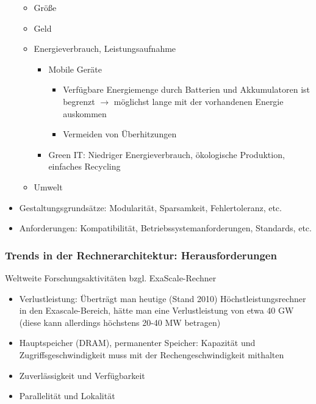 \begin{itemize}
\begin{itemize}
		\item Größe
		\item Geld
		\item Energieverbrauch, Leistungsaufnahme
		\begin{itemize}
			\item Mobile Geräte
			\begin{itemize}
				\item Verfügbare Energiemenge durch Batterien und Akkumulatoren ist begrenzt \(\rightarrow\) möglichst lange mit der vorhandenen Energie auskommen
				\item Vermeiden von Überhitzungen
			\end{itemize}
			\item Green IT: Niedriger Energieverbrauch, ökologische Produktion, einfaches Recycling
		\end{itemize}
		\item Umwelt
	\end{itemize}
	\item Gestaltungsgrundsätze: Modularität, Sparsamkeit, Fehlertoleranz, etc.
	\item Anforderungen: Kompatibilität, Betriebssystemanforderungen, Standards, etc.
\end{itemize}

\subsubsection{Trends in der Rechnerarchitektur: Herausforderungen}
Weltweite Forschungsaktivitäten bzgl. ExaScale-Rechner
\begin{itemize}
	\item Verlustleistung: Überträgt man heutige (Stand 2010) Höchstleistungsrechner in den Exascale-Bereich, hätte man eine Verlustleistung von etwa 40 GW (diese kann allerdings höchstens 20-40 MW betragen)
	\item Hauptspeicher (DRAM), permanenter Speicher: Kapazität und Zugriffsgeschwindigkeit muss mit der Rechengeschwindigkeit mithalten
	\item Zuverlässigkeit und Verfügbarkeit
	\item Parallelität und Lokalität
\end{itemize}


